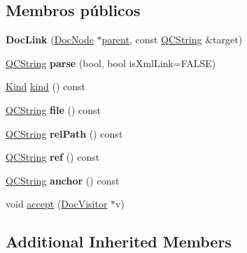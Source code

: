 \subsection*{Membros públicos}
\begin{DoxyCompactItemize}
\item 
\hypertarget{class_doc_link_a9702e86fc365e901e41b40853ef5ff6e}{{\bfseries Doc\-Link} (\hyperlink{class_doc_node}{Doc\-Node} $\ast$\hyperlink{class_doc_node_abd7f070d6b0a38b4da71c2806578d19d}{parent}, const \hyperlink{class_q_c_string}{Q\-C\-String} \&target)}\label{class_doc_link_a9702e86fc365e901e41b40853ef5ff6e}

\item 
\hypertarget{class_doc_link_a516738f6495e33170db35f77857c7ca1}{\hyperlink{class_q_c_string}{Q\-C\-String} {\bfseries parse} (bool, bool is\-Xml\-Link=F\-A\-L\-S\-E)}\label{class_doc_link_a516738f6495e33170db35f77857c7ca1}

\item 
\hyperlink{class_doc_node_aa10c9e8951b8ccf714a59ec321bdac5b}{Kind} \hyperlink{class_doc_link_aa9d037bed9f9a083d0cd01485637d843}{kind} () const 
\item 
\hypertarget{class_doc_link_aeaa8cdb0fbabc1058b7d3813f2fd223b}{\hyperlink{class_q_c_string}{Q\-C\-String} {\bfseries file} () const }\label{class_doc_link_aeaa8cdb0fbabc1058b7d3813f2fd223b}

\item 
\hypertarget{class_doc_link_a3aa6799d4713d51d9cc4862af165671c}{\hyperlink{class_q_c_string}{Q\-C\-String} {\bfseries rel\-Path} () const }\label{class_doc_link_a3aa6799d4713d51d9cc4862af165671c}

\item 
\hypertarget{class_doc_link_aba9c65e4f9c616d6552a1b5d5e9519a6}{\hyperlink{class_q_c_string}{Q\-C\-String} {\bfseries ref} () const }\label{class_doc_link_aba9c65e4f9c616d6552a1b5d5e9519a6}

\item 
\hypertarget{class_doc_link_acd17ae1d9600f864b1beb85dfb99a4f4}{\hyperlink{class_q_c_string}{Q\-C\-String} {\bfseries anchor} () const }\label{class_doc_link_acd17ae1d9600f864b1beb85dfb99a4f4}

\item 
void \hyperlink{class_doc_link_a7ba716e854ae2f8f87a4eb2140e302b6}{accept} (\hyperlink{class_doc_visitor}{Doc\-Visitor} $\ast$v)
\end{DoxyCompactItemize}
\subsection*{Additional Inherited Members}


